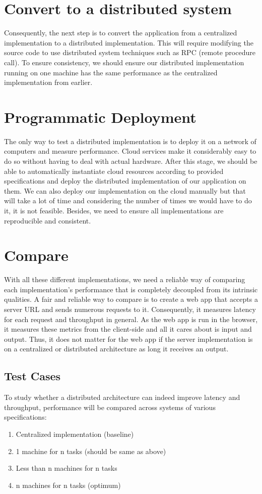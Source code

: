 \documentclass{report}
\begin{document}
\section{Convert to a distributed system}
Consequently, the next step is to convert the application from a centralized implementation to a distributed implementation.
This will require modifying the source code to use distributed system techniques such as RPC (remote procedure call).
To ensure consistency, we should ensure our distributed implementation running on one machine has the same performance as the centralized implementation from earlier.

\section{Programmatic Deployment}
The only way to test a distributed implementation is to deploy it on a network of computers and measure performance.
Cloud services make it considerably easy to do so without having to deal with actual hardware.
After this stage, we should be able to automatically instantiate cloud resources according to provided specifications and deploy the distributed implementation of our application on them.
We can also deploy our implementation on the cloud manually but that will take a lot of time and considering the number of times we would have to do it, it is not feasible.
Besides, we need to ensure all implementations are reproducible and consistent. 

\section{Compare}
With all these different implementations, we need a reliable way of comparing each implementation's performance that is completely decoupled from its intrinsic qualities. A fair and reliable way to compare is to create a web app that accepts a server URL and sends numerous requests to it. Consequently, it measures latency for each request and throughput in general. As the web app is run in the browser, it measures these metrics from the client-side and all it cares about is input and output. Thus, it does not matter for the web app if the server implementation is on a centralized or distributed architecture as long it receives an output.

\subsection{Test Cases}
To study whether a distributed architecture can indeed improve latency and throughput, performance will be compared across systems of various specifications:
\begin{enumerate}
  \item Centralized implementation (baseline)
  \item 1 machine for n tasks (should be same as above)
  \item Less than n machines for n tasks
  \item n machines for n tasks (optimum)
\end{enumerate}
\end{document}
